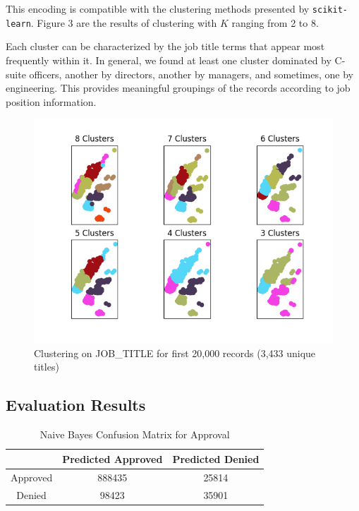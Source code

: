 \documentclass[sigconf]{acmart}
\begin{document}
This encoding is compatible with the clustering methods presented by \texttt{scikit-learn}. Figure 3
are the results of clustering with $K$ ranging from 2 to 8.

Each cluster can be characterized by the job title terms that appear most frequently within it. In
general, we found at least one cluster dominated by C-suite officers, another by directors, another
by managers, and sometimes, one by engineering. This provides meaningful groupings of the records
according to job position information.

\begin{figure}[ht]
  \centering
  \includegraphics[]{clustering}
  \caption{Clustering on JOB\_TITLE for first 20,000 records (3,433 unique titles)}
\end{figure}

\subsection{Evaluation Results}

\begin{table}[h]
    \caption{Naive Bayes Confusion Matrix for Approval}
    \centering
    \begin{tabular}{c| c |c}
        &Predicted Approved&Predicted Denied\\
        \hline
        Approved& 888435& 25814\\
        Denied  & 98423 & 35901\\
    \end{tabular}
\end{table}
\end{document}

